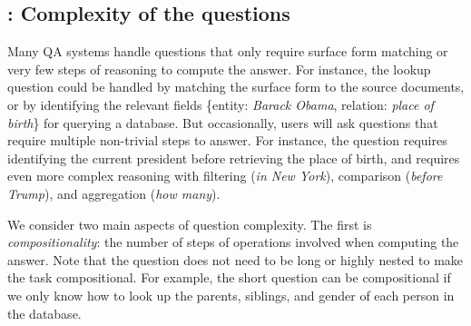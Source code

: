 
\subsection{\Depth: Complexity of the questions}
\label{sec:intro-depth}

Many QA systems handle questions that only require
surface form matching or very few steps of reasoning
to compute the answer.
For instance,
the lookup question 
could be handled by matching the surface form
to the source documents,
or by identifying the relevant fields
\{entity: \emph{Barack Obama}, relation: \emph{place of birth}\}
for querying a database.
But occasionally, users will ask questions
that require multiple non-trivial steps to answer.
For instance, the question
requires identifying the current president
before retrieving the place of birth,
and
requires even more complex reasoning
with filtering (\emph{in New York}),
comparison (\emph{before Trump}), and
aggregation (\emph{how many}).

We consider two main aspects of question complexity.
The first is \emph{compositionality}:
the number of steps of operations involved
when computing the answer.
Note that the question does not need to be long or highly nested
to make the task compositional.
For example, the short question 
can be compositional if we only know how to look up
the parents, siblings, and gender of each person in the database.

